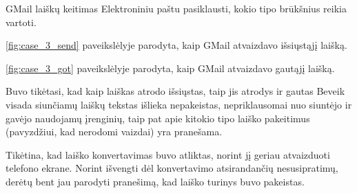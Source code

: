 \begin{xcase}{GMail laiškų keitimas}
  \xcgoal
  {
    Elektroniniu paštu pasiklausti, kokio tipo brūkšnius reikia vartoti.
  }
  
  \xctools
  {
    \ref{fig:case_3_send} paveikslėlyje parodyta, kaip GMail atvaizdavo
    išsiųstąjį laišką.

  }
  
  \xcresult
  {
    \ref{fig:case_3_got} paveikslėlyje parodyta, kaip GMail atvaizdavo
    gautąjį laišką.
    
  }
  
  \xcprinciples
  {
    {
      Buvo tikėtasi, kad kaip laiškas atrodo išsiųstas,
      taip jis atrodys ir gautas
    }
    {
      Beveik visada siunčiamų laiškų tekstas išlieka nepakeistas,
      nepriklausomai nuo siuntėjo ir gavėjo naudojamų įrenginių, taip
      pat apie kitokio tipo laiško pakeitimus (pavyzdžiui, kad nerodomi
      vaizdai) yra pranešama.
    }
  }
  
  \xcthoughts
  {
    Tikėtina, kad laiško konvertavimas buvo atliktas, norint jį geriau
    atvaizduoti telefono ekrane. Norint išvengti dėl konvertavimo
    atsirandančių nesusipratimų, derėtų bent jau parodyti pranešimą, kad
    laiško turinys buvo pakeistas.
  }
\end{xcase}
